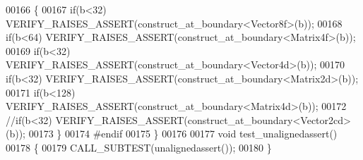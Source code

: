 \begin{DoxyCode}
00166   \{
00167     \textcolor{keywordflow}{if}(b<32)  VERIFY\_RAISES\_ASSERT(construct\_at\_boundary<Vector8f>(b));
00168     \textcolor{keywordflow}{if}(b<64)  VERIFY\_RAISES\_ASSERT(construct\_at\_boundary<Matrix4f>(b));
00169     \textcolor{keywordflow}{if}(b<32)  VERIFY\_RAISES\_ASSERT(construct\_at\_boundary<Vector4d>(b));
00170     \textcolor{keywordflow}{if}(b<32)  VERIFY\_RAISES\_ASSERT(construct\_at\_boundary<Matrix2d>(b));
00171     \textcolor{keywordflow}{if}(b<128) VERIFY\_RAISES\_ASSERT(construct\_at\_boundary<Matrix4d>(b));
00172     \textcolor{comment}{//if(b<32)  VERIFY\_RAISES\_ASSERT(construct\_at\_boundary<Vector2cd>(b));}
00173   \}
00174 \textcolor{preprocessor}{#endif}
00175 \}
00176 
00177 \textcolor{keywordtype}{void} test\_unalignedassert()
00178 \{
00179   CALL\_SUBTEST(unalignedassert());
00180 \}
\end{DoxyCode}

